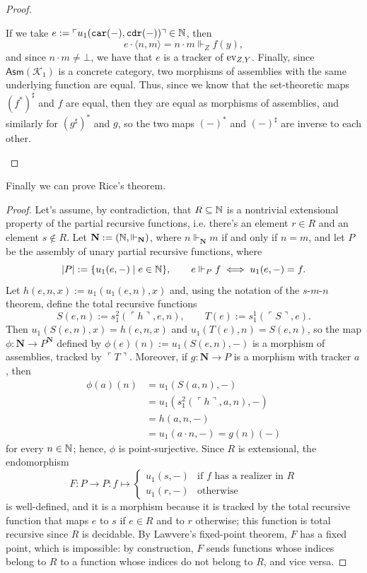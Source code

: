 \begin{proof}
\begin{itemize}
        If we take $e := \ulcorner u_1(\texttt{car}(-),\texttt{cdr}(-)) \urcorner \in \mathbb{N}$, then
        \[ e \cdot \langle n,m \rangle = n \cdot m \Vdash_Z f(y), \]
        and since $n \cdot m \ne \bot$, we have that $e$ is a tracker of $\operatorname{ev}_{Z,Y}$.\newline
        Finally, since $\mathsf{Asm}(\mathcal K_1)$ is a concrete category, two morphisms of assemblies with the same underlying function are equal. Thus,
        since we know that the set-theoretic maps $(f^*)^\sharp$ and $f$ are equal, then they are equal as morphisms of assemblies, and similarly for $(g^\sharp)^*$ and $g$, so the two maps $(-)^*$ and $(-)^\sharp$ are inverse to each other.
    \end{itemize}
\end{proof}

Finally we can prove Rice's theorem.

\begin{proof}
    Let's assume, by contradiction, that $R \subseteq \mathbb{N}$ is a nontrivial extensional property of the partial recursive functions, i.e. there's an element $r \in R$ and an element $s \notin R$.
    Let $\mathbf N := (\mathbb{N},\Vdash_{\mathbf N})$, where $n \Vdash_{\mathbf N} m$ if and only if $n=m$, and let $P$ be the assembly of unary partial recursive functions, where
    \[ |P| := \{u_1(e,-)\mid e\in\mathbb{N}\}, \qquad e\Vdash_P f \iff u_1(e,-) = f. \]
    Let $h(e,n,x):=u_1(u_1(e,n),x)$ and, using the notation of the $s$-$m$-$n$ theorem, define the total recursive functions
    \[ S(e,n) := s_1^2(\ulcorner h\urcorner,e,n), \qquad T(e) := s_1^1(\ulcorner S\urcorner,e). \]
    Then $u_1(S(e,n),x)=h(e,n,x)$ and $u_1(T(e),n)=S(e,n)$, so the map $\phi:\mathbf N\to P^{\mathbf N}$ defined by $\phi(e)(n):=u_1(S(e,n),-)$ is a morphism of assemblies, tracked by $\ulcorner T\urcorner$.
    Moreover, if $g:\mathbf N\to P$ is a morphism with tracker $a$, then
    \begin{align*}
        \phi(a)(n) &= u_1(S(a,n),-) \\
                   &= u_1(s_1^2(\ulcorner h\urcorner,a,n),-) \\
                   &= h(a,n,-) \\
                   &= u_1(a \cdot n, -) = g(n)(-)
    \end{align*}
    for every $n\in\mathbb{N}$; hence, $\phi$ is point-surjective. Since $R$ is extensional, the endomorphism
    \[ F:P\to P:f\mapsto\begin{cases} u_1(s,-) & \text{if $f$ has a realizer in $R$}\\
                                      u_1(r,-) & \text{otherwise}
    \end{cases} \]
    is well-defined, and it is a morphism because it is tracked by the total recursive function that maps $e$ to $s$ if $e\in R$ and to $r$ otherwise;
    this function is total recursive since $R$ is decidable. By Lawvere's fixed-point theorem, $F$ has a fixed point, which is impossible: by construction, $F$ sends functions whose indices belong to $R$ to a function whose indices do not belong to $R$, and vice versa.
\end{proof}


